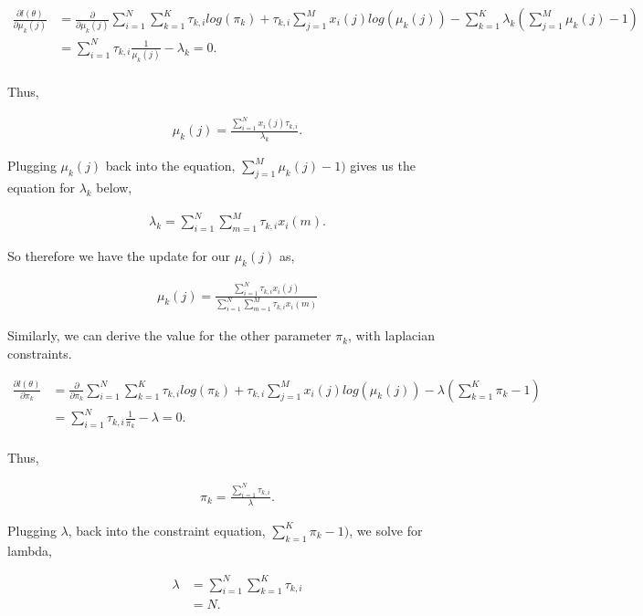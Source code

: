 \documentclass[paper=a4, fontsize=11pt]{scrartcl} %
\begin{document}
\begin{align}
\frac{\partial l(\theta)}{\partial \mu_k(j)} &=\frac{\partial}{\partial \mu_k(j)}  \sum_{i=1}^N \sum_{k=1}^K \tau_{k,i} log(\pi_k) + \tau_{k,i}\sum_{j=1}^M x_i(j) log(\mu_k(j)) - \sum_{k=1}^K \lambda_k (\sum_{j=1}^M \mu_k(j) -1) \\
&=  \sum_{i=1}^N  \tau_{k,i} \frac{1}{\mu_k(j)} - \lambda_k = 0. \\
\end{align}

Thus, 

\begin{align}
\mu_k(j) =  \frac{\sum_{i=1}^N x_i(j) \tau_{k,i}}{\lambda_k}.
\end{align}

Plugging $\mu_k(j)$ back into the equation, $\sum_{j=1}^M \mu_k(j) -1)$ gives us the equation for $\lambda_k$ below,

\begin{align}
\lambda_k = \sum_{i=1}^N \sum_{m=1}^M \tau_{k,i} x_i(m).
\end{align}

So therefore we have the update for our $\mu_k(j)$ as, 

\begin{align}
\mu_k(j) = \frac{\sum_{i=1}^N \tau_{k,i} x_i(j)}{\sum_{i=1}^N \sum_{m=1}^M \tau_{k,i} x_i(m)}
\end{align}

Similarly, we can derive the value for the other parameter $\pi_k$, with laplacian constraints.

\begin{align}
\frac{\partial l(\theta)}{\partial \pi_k} &=\frac{\partial}{\partial \pi_k}  \sum_{i=1}^N \sum_{k=1}^K \tau_{k,i} log(\pi_k) + \tau_{k,i}\sum_{j=1}^M x_i(j) log(\mu_k(j)) - \lambda (\sum_{k=1}^K \pi_k -1) \\
&=  \sum_{i=1}^N  \tau_{k,i} \frac{1}{\pi_k} - \lambda = 0. \\
\end{align}

Thus, 

\begin{align}
\pi_k =  \frac{\sum_{i=1}^N \tau_{k,i}}{\lambda}.
\end{align} 

Plugging $\lambda$, back into the constraint equation, $\sum_{k=1}^K \pi_k -1)$, we solve for lambda, 

\begin{align}
\lambda &= \sum_{i=1}^N \sum_{k=1}^K \tau_{k,i} \\
& = N.
\end{align}
\end{document}
